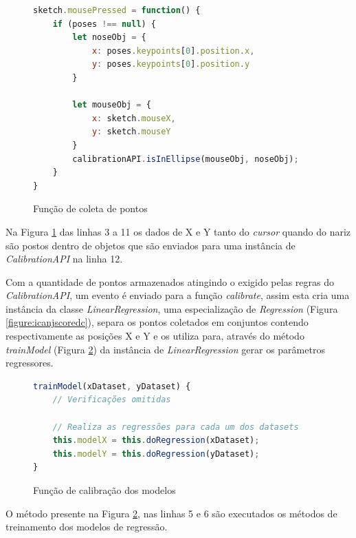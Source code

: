 \begin{figure}[H]
    \centering
    \caption{Função de coleta de pontos}
    \begin{lstlisting}[language=JavaScript]
sketch.mousePressed = function() {
    if (poses !== null) {
        let noseObj = {
            x: poses.keypoints[0].position.x,
            y: poses.keypoints[0].position.y
        }
        
        let mouseObj = {
            x: sketch.mouseX,
            y: sketch.mouseY
        }
        calibrationAPI.isInEllipse(mouseObj, noseObj);
    }
}
    \end{lstlisting}
    \label{figure:funcao_coleta_de_pontos_calibracao}
\end{figure}

\par Na Figura \ref{figure:funcao_coleta_de_pontos_calibracao} das linhas 3 a 11 os dados de X e Y tanto do \textit{cursor} quando do nariz são postos dentro de objetos que são enviados para uma instância de \textit{CalibrationAPI} na linha 12.

\par Com a quantidade de pontos armazenados atingindo o exigido pelas regras do \textit{CalibrationAPI}, um evento é enviado para a função \textit{calibrate}, assim esta cria uma instância da classe \textit{LinearRegression}, uma especialização de \textit{Regression} (Figura \ref{figure:icanjscoredc}), separa os pontos coletados em conjuntos contendo respectivamente as posições X e Y e os utiliza para, através do método \textit{trainModel} (Figura \ref{figure:funcao_calibracao_modelo_de_regressao}) da instância de \textit{LinearRegression} gerar os parâmetros regressores.

\begin{figure}[H]
    \centering
    \caption{Função de calibração dos modelos}
    \begin{lstlisting}[language=JavaScript]
trainModel(xDataset, yDataset) {
    // Verificações omitidas

    // Realiza as regressões para cada um dos datasets
    this.modelX = this.doRegression(xDataset);
    this.modelY = this.doRegression(yDataset);
}
    \end{lstlisting}
    \label{figure:funcao_calibracao_modelo_de_regressao}
\end{figure}

\par O método presente na Figura \ref{figure:funcao_calibracao_modelo_de_regressao}, nas linhas 5 e 6 são executados os métodos de treinamento dos modelos de regressão.

